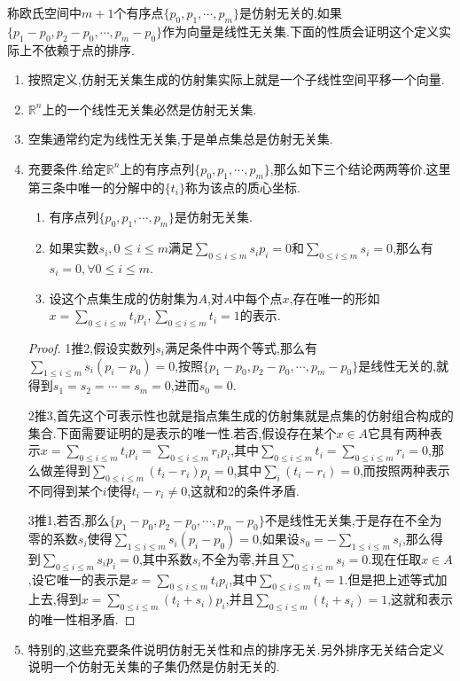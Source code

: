 称欧氏空间中$m+1$个有序点$\{p_0,p_1,\cdots,p_m\}$是仿射无关的,如果$\{p_1-p_0,p_2-p_0,\cdots,p_m-p_0\}$作为向量是线性无关集.下面的性质会证明这个定义实际上不依赖于点的排序.
\begin{enumerate}
	\item 按照定义,仿射无关集生成的仿射集实际上就是一个子线性空间平移一个向量.
	\item $\mathbb{R}^n$上的一个线性无关集必然是仿射无关集.
	\item 空集通常约定为线性无关集,于是单点集总是仿射无关集.
	\item 充要条件.给定$\mathbb{R}^n$上的有序点列$\{p_0,p_1,\cdots,p_m\}$,那么如下三个结论两两等价.这里第三条中唯一的分解中的$\{t_i\}$称为该点的质心坐标.
	\begin{enumerate}
		\item 有序点列$\{p_0,p_1,\cdots,p_m\}$是仿射无关集.
		\item 如果实数$s_i,0\le i\le m$满足$\sum_{0\le i\le m}s_ip_i=0$和$\sum_{0\le i\le m}s_i=0$,那么有$s_i=0,\forall 0\le i\le m$.
		\item 设这个点集生成的仿射集为$A$,对$A$中每个点$x$,存在唯一的形如$x=\sum_{0\le i\le m}t_ip_i,\sum_{0\le i\le m}t_i=1$的表示.
	\end{enumerate}
	\begin{proof}
		
		1推2,假设实数列$s_i$满足条件中两个等式,那么有$\sum_{1\le i\le m}s_i(p_i-p_0)=0$,按照$\{p_1-p_0,p_2-p_0,\cdots,p_m-p_0\}$是线性无关的,就得到$s_1=s_2=\cdots=s_m=0$,进而$s_0=0$.
		
		2推3,首先这个可表示性也就是指点集生成的仿射集就是点集的仿射组合构成的集合.下面需要证明的是表示的唯一性.若否,假设存在某个$x\in A$它具有两种表示$x=\sum_{0\le i\le m}t_ip_i=\sum_{0\le i\le m}r_ip_i$,其中$\sum_{0\le i\le m}t_i=\sum_{0\le i\le m}r_i=0$,那么做差得到$\sum_{0\le i\le m}(t_i-r_i)p_i=0$,其中$\sum_i(t_i-r_i)=0$,而按照两种表示不同得到某个$i$使得$t_i-r_i\not=0$,这就和2的条件矛盾.
		
		3推1,若否,那么$\{p_1-p_0,p_2-p_0,\cdots,p_m-p_0\}$不是线性无关集,于是存在不全为零的系数$s_i$使得$\sum_{1\le i\le m}s_i(p_i-p_0)=0$,如果设$s_0=-\sum_{1\le i\le m}s_i$,那么得到$\sum_{0\le i\le m}s_ip_i=0$,其中系数$s_i$不全为零,并且$\sum_{0\le i\le m}s_i=0$.现在任取$x\in A$,设它唯一的表示是$x=\sum_{0\le i\le m}t_ip_i$,其中$\sum_{0\le i\le m}t_i=1$.但是把上述等式加上去,得到$x=\sum_{0\le i\le m}(t_i+s_i)p_i$,并且$\sum_{0\le i\le m}(t_i+s_i)=1$,这就和表示的唯一性相矛盾.
	\end{proof}
	\item 特别的,这些充要条件说明仿射无关性和点的排序无关.另外排序无关结合定义说明一个仿射无关集的子集仍然是仿射无关的.
\end{enumerate}
	
